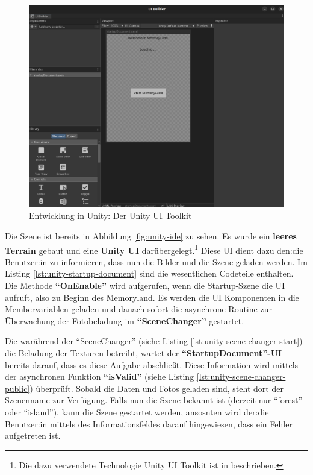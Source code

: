 \begin{figure} [h t]
    \centering
    \includegraphics[scale=0.12]{pics/unity-ui-builder.png}
    \caption{Entwicklung in Unity: Der Unity UI Toolkit}
    \label{fig:unity-ui-builder}
\end{figure}


Die Szene ist bereits in Abbildung \ref{fig:unity-ide} zu sehen. Es wurde ein \textbf{leeres Terrain} gebaut und eine \textbf{Unity UI} darübergelegt.\footnote{Die dazu verwendete Technologie Unity UI Toolkit ist in \cite{UnityDocsUIToolkit} beschrieben.} Diese UI dient dazu den:die Benutzer:in zu informieren, dass nun die Bilder und die Szene geladen werden. Im Listing \ref{lst:unity-startup-document} sind die wesentlichen Codeteile enthalten. Die Methode \textbf{``OnEnable''} wird aufgerufen, wenn die Startup-Szene die UI aufruft, also zu Beginn des Memoryland. Es werden die UI Komponenten in die Membervariablen geladen und danach sofort die asynchrone Routine zur Überwachung der Fotobeladung im \textbf{``SceneChanger''} gestartet. 


Die warährend der ``SceneChanger'' (siehe Listing \ref{lst:unity-scene-changer-start}) die Beladung der Texturen betreibt, wartet der \textbf{``StartupDocument''-UI} bereits darauf, dass es diese Aufgabe abschlie\ss{}t. Diese Information wird mittels der asynchronen Funktion \textbf{``isValid''} (siehe Listing \ref{lst:unity-scene-changer-public}) überprüft. Sobald die Daten und Fotos geladen sind, steht dort der Szenenname zur Verfügung. Falls nun die Szene bekannt ist (derzeit nur ``forest'' oder ``island''), kann die Szene gestartet werden, ansosnten wird der:die Benutzer:in mittels des Informationsfeldes darauf hingewiesen, dass ein Fehler aufgetreten ist.



